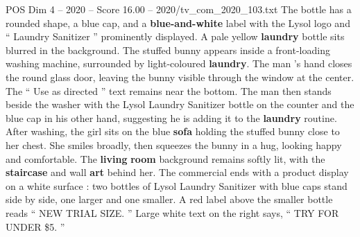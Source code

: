 \begin{textsample}{POS Dim 4 – 2020 – Score 16.00 – 2020/tv\_com\_2020\_103.txt}
The bottle has a rounded shape, a blue cap, and a \textbf{blue-and-white} label with the Lysol logo and “ Laundry Sanitizer ” prominently displayed.
A pale yellow \textbf{laundry} bottle sits blurred in the background.
The stuffed bunny appears inside a front-loading washing machine, surrounded by light-coloured \textbf{laundry}.
The man ’s hand closes the round glass door, leaving the bunny visible through the window at the center.
The “ Use as directed ” text remains near the bottom.
The man then stands beside the washer with the Lysol Laundry Sanitizer bottle on the counter and the blue cap in his other hand, suggesting he is adding it to the \textbf{laundry} routine.
After washing, the girl sits on the blue \textbf{sofa} holding the stuffed bunny close to her chest.
She smiles broadly, then squeezes the bunny in a hug, looking happy and comfortable.
The \textbf{living} \textbf{room} background remains softly lit, with the \textbf{staircase} and wall \textbf{art} behind her.
The commercial ends with a product display on a white surface : two bottles of Lysol Laundry Sanitizer with blue caps stand side by side, one larger and one smaller.
A red label above the smaller bottle reads “ NEW TRIAL SIZE. ” Large white text on the right says, “ TRY FOR UNDER \$5. ”

\end{textsample}
